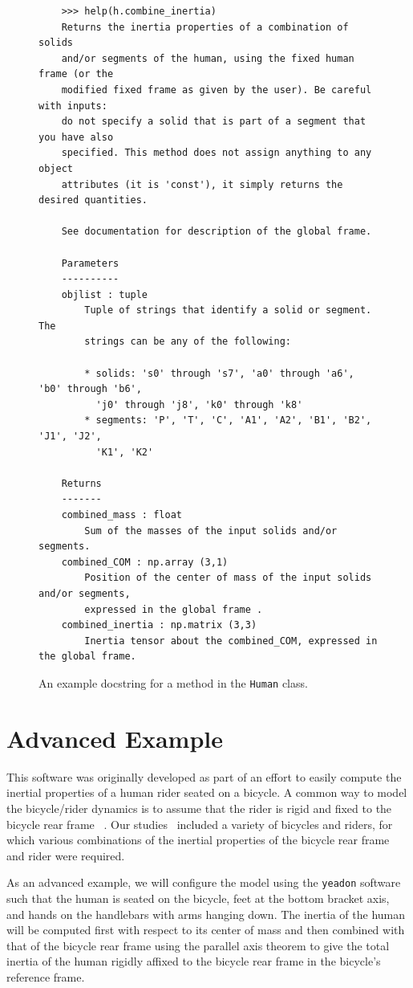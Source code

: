\documentclass[10pt,a4paper,twocolumn]{article}
\begin{document}
\begin{figure}
  \begin{verbatim}
    >>> help(h.combine_inertia)
    Returns the inertia properties of a combination of solids
    and/or segments of the human, using the fixed human frame (or the
    modified fixed frame as given by the user). Be careful with inputs:
    do not specify a solid that is part of a segment that you have also
    specified. This method does not assign anything to any object
    attributes (it is 'const'), it simply returns the desired quantities.

    See documentation for description of the global frame.

    Parameters
    ----------
    objlist : tuple
        Tuple of strings that identify a solid or segment. The
        strings can be any of the following:

        * solids: 's0' through 's7', 'a0' through 'a6', 'b0' through 'b6',
          'j0' through 'j8', 'k0' through 'k8'
        * segments: 'P', 'T', 'C', 'A1', 'A2', 'B1', 'B2', 'J1', 'J2',
          'K1', 'K2'

    Returns
    -------
    combined_mass : float
        Sum of the masses of the input solids and/or segments.
    combined_COM : np.array (3,1)
        Position of the center of mass of the input solids and/or segments,
        expressed in the global frame .
    combined_inertia : np.matrix (3,3)
        Inertia tensor about the combined_COM, expressed in the global frame.
  \end{verbatim}
  \cprotect\caption{An example docstring for a method in the \verb+Human+ class.}
  \label{fig:docstring}
\end{figure}

\section*{Advanced Example}
\label{sec:advanced-example}

This software was originally developed as part of an effort to easily compute
the inertial properties of a human rider seated on a bicycle. A common way to
model the bicycle/rider dynamics is to assume that the rider is rigid
and fixed to the bicycle rear frame ~\cite{Meijaard2007a}. Our
studies~\cite{Moore2012} included a variety of bicycles and riders, for which
various combinations of the inertial properties of the bicycle rear frame and
rider were required.

As an advanced example, we will configure the model using the
\verb+yeadon+ software such that the human is seated on the bicycle, feet at the
bottom bracket axis, and hands on the handlebars with arms hanging down. The inertia
of the human will be computed first with respect to its center of mass and then combined
with that of the bicycle rear frame  using the parallel axis theorem to
give the total inertia of the human rigidly affixed to the bicycle rear frame
in the bicycle's reference frame.
\end{document}
